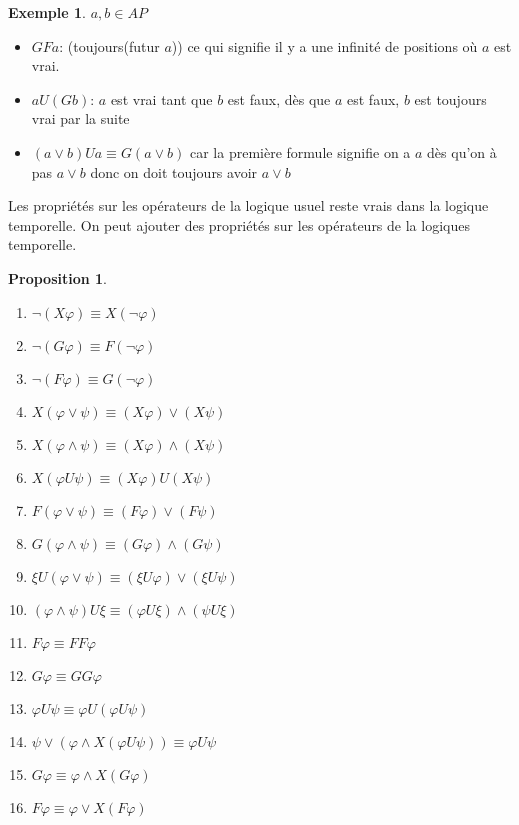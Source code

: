 \documentclass[12pt,a4paper]{article}
\theoremstyle{plain}
\newtheorem{prop}{Proposition}
\theoremstyle{definition}
\newtheorem{ex}{Exemple}
\begin{document}
\begin{ex} 
	\leavevmode \newline
	$a, b \in AP$
	\begin{itemize}
		\item $GFa$: (toujours(futur $a$)) ce qui signifie il y a une infinité de positions où $a$ est vrai.
		\item $aU(Gb)$: $a$ est vrai tant que $b$ est faux, dès que $a$ est faux, $b$ est toujours vrai par la suite
		\item $(a\lor b ) U a \equiv G(a \lor b)$ car la première formule signifie on a $a$ dès qu'on à pas $a\lor b$ donc on doit toujours avoir $a \lor b$
	\end{itemize}
\end{ex}
Les propriétés sur les opérateurs de la logique usuel reste vrais dans la logique temporelle. On peut ajouter des propriétés sur les opérateurs de la logiques temporelle.
\begin{prop} 
	\leavevmode 
	\begin{enumerate}
		\item $\lnot (X \varphi) \equiv X(\lnot \varphi)$
		\item $\lnot (G \varphi) \equiv F(\lnot \varphi)$
		\item $\lnot (F \varphi) \equiv G(\lnot \varphi)$
		
		\item $X (\varphi \lor \psi) \equiv (X \varphi) \lor (X \psi)$
		\item $X (\varphi \land \psi) \equiv (X \varphi) \land (X \psi)$
		\item $X (\varphi U \psi) \equiv (X \varphi) U (X \psi)$
		\item $F (\varphi \lor \psi) \equiv (F \varphi) \lor (F \psi)$
		\item $G (\varphi \land \psi) \equiv (G \varphi) \land (G \psi)$
		\item $\xi U (\varphi \lor \psi) \equiv (\xi U \varphi) \lor (\xi U \psi)$
		\item $(\varphi \land \psi) U \xi \equiv (\varphi U \xi) \land (\psi U \xi)$
		
		\item $F \varphi \equiv FF\varphi$
		\item $G \varphi \equiv GG\varphi$
		\item $\varphi U \psi \equiv \varphi U (\varphi U \psi)$
		\item $\psi \lor (\varphi \land X(\varphi U \psi)) \equiv \varphi U \psi$
		\item $G \varphi \equiv \varphi \land X(G \varphi)$
		\item $F \varphi \equiv \varphi \lor X(F\varphi)$
	\end{enumerate}
\end{prop}
\end{document}
